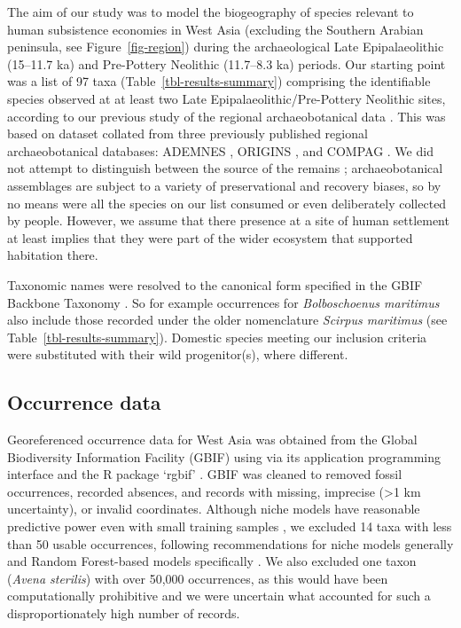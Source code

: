 \documentclass[
  authoryear,
  preprint]{elsarticle}
\begin{document}
The aim of our study was to model the biogeography of species relevant
to human subsistence economies in West Asia (excluding the Southern
Arabian peninsula, see Figure~\ref{fig-region}) during the
archaeological Late Epipalaeolithic (15--11.7 ka) and Pre-Pottery
Neolithic (11.7--8.3 ka) periods. Our starting point was a list of 97
taxa (Table~\ref{tbl-results-summary}) comprising the identifiable
species observed at at least two Late Epipalaeolithic/Pre-Pottery
Neolithic sites, according to our previous study of the regional
archaeobotanical data \citep{ArranzOtaeguiRoe2023}. This was based on
dataset collated from three previously published regional
archaeobotanical databases: ADEMNES \citep{ADEMNES}, ORIGINS
\citep{ORIGINS}, and COMPAG \citep{COMPAG}. We did not attempt to
distinguish between the source of the remains
\citep[cf.][]{WallaceEtAl2018}; archaeobotanical assemblages are subject
to a variety of preservational and recovery biases, so by no means were
all the species on our list consumed or even deliberately collected by
people. However, we assume that there presence at a site of human
settlement at least implies that they were part of the wider ecosystem
that supported habitation there.

Taxonomic names were resolved to the canonical form specified in the
GBIF Backbone Taxonomy \citep{GBIFSecretariat2023}. So for example
occurrences for \emph{Bolboschoenus maritimus} also include those
recorded under the older nomenclature \emph{Scirpus maritimus} (see
Table~\ref{tbl-results-summary}). Domestic species meeting our inclusion
criteria were substituted with their wild progenitor(s), where
different.

\subsection{Occurrence data}\label{occurrence-data}

Georeferenced occurrence data for West Asia was obtained from the Global
Biodiversity Information Facility (GBIF) using via its application
programming interface and the R package `rgbif'
\citep{ChamberlainBoettiger2017, rgbif}. GBIF was cleaned to removed
fossil occurrences, recorded absences, and records with missing,
imprecise (\textgreater1 km uncertainty), or invalid coordinates.
Although niche models have reasonable predictive power even with small
training samples
\citep{StockwellPeterson2002, HernandezEtAl2006, WiszEtAl2008}, we
excluded 14 taxa with less than 50 usable occurrences, following
recommendations for niche models generally and Random Forest-based
models specifically \citep{StockwellPeterson2002, LuanEtAl2020}. We also
excluded one taxon (\emph{Avena sterilis}) with over 50,000 occurrences,
as this would have been computationally prohibitive and we were
uncertain what accounted for such a disproportionately high number of
records.
\end{document}
